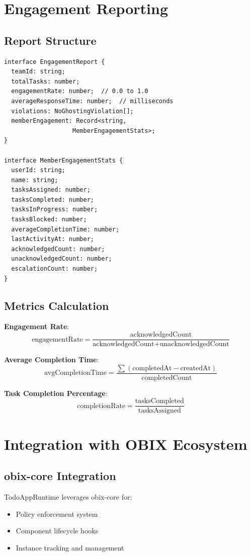 \documentclass[12pt,a4paper]{article}
\begin{document}
\section{Engagement Reporting}

\subsection{Report Structure}

\begin{lstlisting}
interface EngagementReport {
  teamId: string;
  totalTasks: number;
  engagementRate: number;  // 0.0 to 1.0
  averageResponseTime: number;  // milliseconds
  violations: NoGhostingViolation[];
  memberEngagement: Record<string,
                   MemberEngagementStats>;
}

interface MemberEngagementStats {
  userId: string;
  name: string;
  tasksAssigned: number;
  tasksCompleted: number;
  tasksInProgress: number;
  tasksBlocked: number;
  averageCompletionTime: number;
  lastActivityAt: number;
  acknowledgedCount: number;
  unacknowledgedCount: number;
  escalationCount: number;
}
\end{lstlisting}

\subsection{Metrics Calculation}

\textbf{Engagement Rate}:
$$\text{engagementRate} = \frac{\text{acknowledgedCount}}{\text{acknowledgedCount} + \text{unacknowledgedCount}}$$

\textbf{Average Completion Time}:
$$\text{avgCompletionTime} = \frac{\sum (\text{completedAt} - \text{createdAt})}{\text{completedCount}}$$

\textbf{Task Completion Percentage}:
$$\text{completionRate} = \frac{\text{tasksCompleted}}{\text{tasksAssigned}}$$

\section{Integration with OBIX Ecosystem}

\subsection{obix-core Integration}

TodoAppRuntime leverages obix-core for:
\begin{itemize}
  \item Policy enforcement system
  \item Component lifecycle hooks
  \item Instance tracking and management
\end{itemize}
\end{document}
